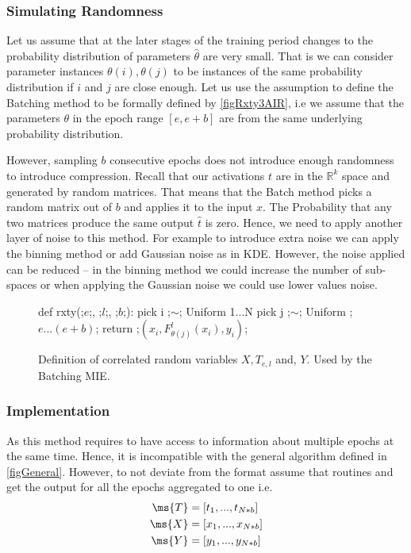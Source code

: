 \documentclass[dissertation.tex]{subfiles}
\begin{document}
\subsubsection{Simulating Randomness}

Let us assume that at the later stages of the training period changes to the
probability distribution of parameters $\hat\theta$ are very small. That is we
can consider parameter instances $\theta(i),\theta(j)$ to be instances of the
same probability distribution if $i$ and $j$ are close enough. Let us use the
assumption to define the Batching method to be formally defined by
\autoref{figRxty3AIR}, i.e we assume that the parameters $\theta$ in the epoch
range $[e, e+b]$ are from the same underlying probability distribution.

However, sampling $b$  consecutive epochs does not introduce enough randomness
to introduce compression. Recall that our activations $t$ are in the
$\mathbb{R}^k$ space and generated by random matrices. That means that the Batch
method picks a random matrix out of $b$ and applies it to the input $x$. The
Probability that any two matrices produce the same output $\hat{t}$ is zero.
Hence, we need to apply another layer of noise to this method. For example to
introduce extra noise we can apply the binning method or add Gaussian noise as
in KDE. However, the noise applied can be reduced -- in the binning method we
could increase the number of sub-spaces or when applying the Gaussian noise we
could use lower values noise. 


\begin{figure}[h]
    \begin{pythonfigure}
      def rxty(;$e$;, ;$l$;, ;$b$;):
        pick i ;$\sim$; Uniform {1...N}
        pick j ;$\sim$; Uniform {;$e...(e+b)$;}
        return ;$(x_i, F_{\theta(j)}^l(x_i), y_i)$;
    \end{pythonfigure}
    \caption{
      Definition of correlated random variables $X, T_{e,l}$ and, $Y$. Used by
      the Batching MIE.
    }
    \label{figRxty3AIR}
\end{figure}

\subsubsection{Implementation} As this method requires to have access to
information about multiple epochs at the same time. Hence, it is incompatible
with the general algorithm defined in \autoref{figGeneral}. However, to not
deviate from the format assume that routines  and 
get the output for all the epochs aggregated to one i.e.
\begin{align}
  \ms{T} &= [t_1,...,t_{N*b}]\\
  \ms{X} &= [x_1,...,x_{N*b}]\\
  \ms{Y} &= [y_1,...,y_{N*b}]
\end{align}
\end{document}
